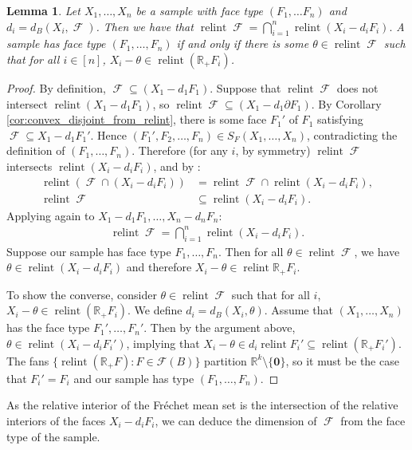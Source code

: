 \documentclass[10pt]{article}
\newtheorem{lemma}[theorem]{Lemma}
\theoremstyle{definition}
\theoremstyle{remark}
\newcommand{\R}{\mathbb{R}}
\newcommand{\sample}{ X_1,\dots, X_n}
\DeclareMathOperator{\relint}{relint}
\DeclareMathOperator{\FMset}{\mathcal{F}}
\renewcommand{\vec}[1]{\mathbf{#1}}
\begin{document}
	\begin{lemma} \label{lemma:geometry_comb_type}
		Let $\sample$ be a sample with face type $(F_1, \dots F_n)$ and $d_i = d_B(X_i,\FMset)$. Then we have that 
		$
		\relint \FMset = \textstyle\bigcap_{i = 1}^n \relint (X_i - d_i F_i).
		$
		A sample has face type $(F_1, \dots, F_n)$ if and only if there is some $\theta \in \relint \FMset$ such that for all $i \in [n]$, $X_i - \theta \in \relint (\R_+F_i)$.
	\end{lemma}
	\begin{proof}
		By definition, $\FMset \subseteq (X_1 - d_1 F_1)$.     Suppose that $\relint \FMset$ does not intersect $\relint (X_1 - d_1 F_1)$, so $\relint \FMset \subseteq (X_1 - d_1 \partial F_1)$. By Corollary \ref{cor:convex_disjoint_from_relint}, there is some face $F_1'$ of $F_1$ satisfying $\FMset \subseteq X_1 - d_1 F_1'$. Hence $(F_1', F_2, \dots, F_n) \in S_F(X_1, \dots,X_n)$, contradicting the definition of $(F_1, \dots, F_n)$. Therefore (for any $i$, by symmetry) $\relint \FMset$ intersects $\relint (X_i - d_i F_i)$, and by \cite[Theorem 6.5]{rockafellar1970convex}:
		\begin{align*}
			\relint (\FMset \cap (X_i - d_i F_i)) &= \relint \FMset \cap \relint (X_i - d_i F_i), \\
			\relint \FMset &\subseteq \relint (X_i - d_i F_i).
		\end{align*}
		Applying \cite[Theorem 6.5]{rockafellar1970convex} again to $X_1 - d_1 F_1, \dots, X_n - d_n F_n$:
		\begin{align*}
			\relint \FMset = \textstyle \bigcap_{i = 1}^n \relint (X_i - d_i F_i).
		\end{align*}
		Suppose our sample has face type $F_1, \dots, F_n$. Then for all $\theta \in \relint \FMset$, we have $\theta \in \relint (X_i - d_i F_i)$ and therefore $X_i - \theta \in \relint \R_+ F_i$.
		
		To show the converse, consider $\theta \in \relint \FMset$ such that for all $i$, $X_i - \theta \in \relint (\R_+ F_i)$. We define $d_i = d_B(X_i, \theta)$. Assume that $(\sample)$ has the face type $F_1', \dots, F_n'$. Then by the argument above, $\theta \in \relint(X_i - d_i F_i')$, implying that $X_i - \theta \in d_i \relint F_i' \subseteq \relint (\R_+ F_i')$. The fans $\{ \relint (\R_+F) : F \in \mathscr F (B) \}$ partition $\R^k \setminus \{ \vec 0 \}$, so it must be the case that $F_i' = F_i$ and our sample has type $(F_1, \dots, F_n)$. 
	\end{proof}
	
	As the relative interior of the Fr\'echet mean set is the intersection of the relative interiors of the faces $X_i - d_i F_i$, we can deduce the dimension of $\FMset$ from the face type of the sample.
	
\end{document}
